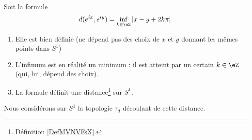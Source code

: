 \begin{propositionDef}      \label{PROPooEQDBooDfOrTZ}
    Soit la formule
    \begin{equation}
        d( e^{ix},  e^{iy})=\inf_{k\in \eZ}| x-y+2k\pi |.
    \end{equation}
    \begin{enumerate}
        \item
            Elle est bien définie (ne dépend pas des choix de \( x\) et \( y\) donnant les mêmes points dans \( S^1\))
        \item
            L'infimum est en réalité un minimum : il est atteint par un certain \( k\in \eZ\) (qui, lui, dépend des choix).
        \item
            La formule définit une distance\footnote{Définition \ref{DefMVNVFsX}.} sur \( S^1\).
    \end{enumerate}
    Nous considérons sur \( S^1\) la topologie \( \tau_d\) découlant de cette distance.
\end{propositionDef}


